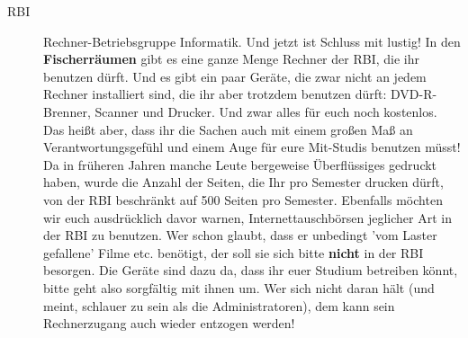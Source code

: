\begin{description}
\item[RBI] Rechner-Betriebsgruppe Informatik. Und jetzt ist Schluss
mit lustig! In den \textbf{Fischerräumen} gibt es eine ganze Menge
Rechner der RBI, die ihr benutzen dürft. Und es gibt ein paar Geräte,
die zwar nicht an jedem Rechner installiert sind, die ihr aber
trotzdem benutzen dürft: DVD-R-Brenner, Scanner und Drucker. Und zwar
alles für euch noch kostenlos. Das heißt aber, dass ihr die Sachen
auch mit einem großen Maß an Verantwortungsgefühl und einem Auge für
eure Mit-Studis benutzen müsst! Da in früheren Jahren manche Leute
bergeweise Überflüssiges gedruckt haben, wurde die Anzahl der Seiten,
die Ihr pro Semester drucken dürft, von der RBI beschränkt auf 500
Seiten pro Semester. Ebenfalls möchten wir euch ausdrücklich davor
warnen, Internettauschbörsen jeglicher Art in der RBI zu benutzen. Wer
schon glaubt, dass er unbedingt 'vom Laster gefallene' Filme etc.
benötigt, der soll sie sich bitte \textbf{nicht} in der RBI besorgen.
Die Geräte sind dazu da, dass ihr euer Studium betreiben könnt, bitte
geht also sorgfältig mit ihnen um. Wer sich nicht daran hält (und
meint, schlauer zu sein als die Administratoren), dem kann sein
Rechnerzugang auch wieder entzogen werden!%



\end{description}
